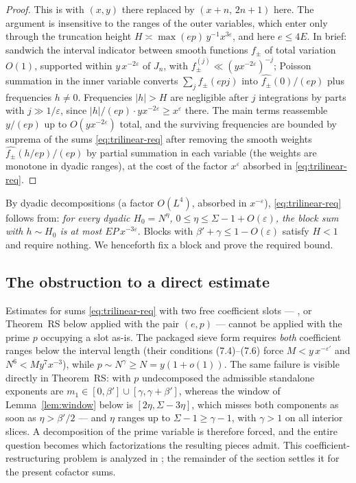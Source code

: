 \documentclass[11pt]{article}
\theoremstyle{remark}
\newcommand{\N}{N}
\newcommand{\J}{J_n}
\begin{document}
\begin{proof}
This is \cite[Lemma~9]{FI} with $(x,y)$ there replaced by $(x+n,\,2n+1)$ here. The
argument is insensitive to the ranges of the outer variables, which enter only through
the truncation height $H\asymp \max(e p)\,y^{-1}x^{3\varepsilon}$, and here $e\le 4E$.
In brief: sandwich the interval indicator between smooth functions $f_{\pm}$ of total
variation $O(1)$, supported within $y\,x^{-2\varepsilon}$ of $\J$, with
$f_\pm^{(j)}\ll (y x^{-2\varepsilon})^{-j}$; Poisson summation in the inner variable
converts $\sum_j f_\pm(epj)$ into $\widehat{f_\pm}(0)/(ep)$ plus frequencies $h\ne 0$.
Frequencies $|h|>H$ are negligible after $j$ integrations by parts with
$j\gg 1/\varepsilon$, since $|h|/(ep)\cdot y x^{-2\varepsilon}\ge x^{\varepsilon}$
there. The main terms reassemble $y/(ep)$ up to $O(y x^{-2\varepsilon})$ total, and the
surviving frequencies are bounded by suprema of the sums \eqref{eq:trilinear-req}
after removing the smooth weights $\widehat{f_\pm}(h/ep)/(ep)$ by partial summation
in each variable (the weights are monotone in dyadic ranges), at the cost of the
factor $x^{\varepsilon}$ absorbed in \eqref{eq:trilinear-req}.
\end{proof}

By dyadic decompositions (a factor $O(L^4)$, absorbed in $x^{-\varepsilon}$),
\eqref{eq:trilinear-req} follows from: \emph{for every dyadic
$H_0=\N^{\eta}$, $0\le \eta\le \Sigma-1+O(\varepsilon)$, the block sum with $h\sim H_0$
is at most $EP\,x^{-3\varepsilon}$}. Blocks with $\beta'+\gamma\le 1-O(\varepsilon)$
satisfy $H<1$ and require nothing. We henceforth fix a block and prove the required
bound.

\subsection{The obstruction to a direct estimate}\label{sec:obstruction}

Estimates for sums \eqref{eq:trilinear-req} with two free coefficient slots ---
\cite[Thm.~6, Thm.~7]{FI}, or Theorem~RS below applied with the pair $(e,p)$ ---
cannot be applied with the prime $p$ occupying a slot as-is. The packaged sieve form
\cite[Thm.~7]{FI} requires \emph{both} coefficient ranges below the interval length
(their conditions (7.4)--(7.6) force $M<y\,x^{-\varepsilon'}$ and $N^6<My^{7}x^{-3}$),
while $p\sim \N^{\gamma}\ge \N=y(1+o(1))$. The same failure is visible directly in
Theorem~RS: with $p$ undecomposed the admissible standalone exponents are
$m_1\in[0,\beta']\cup[\gamma,\gamma+\beta']$, whereas the window of
Lemma~\ref{lem:window} below is $[2\eta,\Sigma-3\eta]$, which misses both components
as soon as $\eta>\beta'/2$ --- and $\eta$ ranges up to $\Sigma-1\ge\gamma-1$, with
$\gamma>1$ on all interior slices. A decomposition of the prime variable is therefore
forced, and the entire question becomes which factorizations the resulting pieces
admit. This coefficient-restructuring problem is analyzed in \cite{RossObstruction}; the
remainder of the section settles it for the present cofactor sums.
\end{document}
